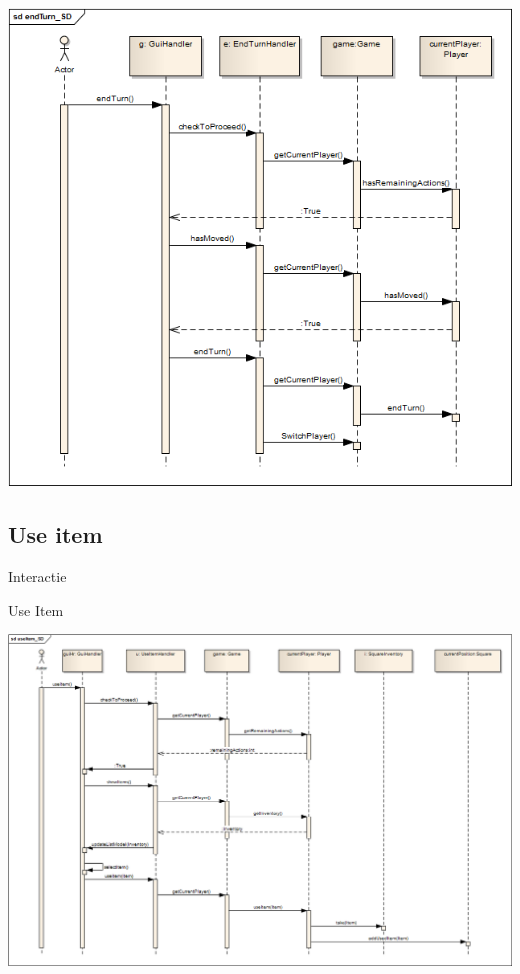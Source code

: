 \documentclass[t]{beamer}
\begin{document}
\begin{frame}[plain]
\begin{center}
\includegraphics[width= 0.90\linewidth]{../uml/endTurn_SD.png}
\end{center}
\end{frame}

\subsection{Use item}
\begin{frame}{Interactie}
\begin{multicols}{2}
\tableofcontents[currentsection]
\end{multicols}
\end{frame}

\begin{frame}[plain]{Use Item}
\begin{center}
\includegraphics[width= 1\linewidth]{../uml/useItem_SD.png}
\end{center}
\end{frame}
\end{document}
